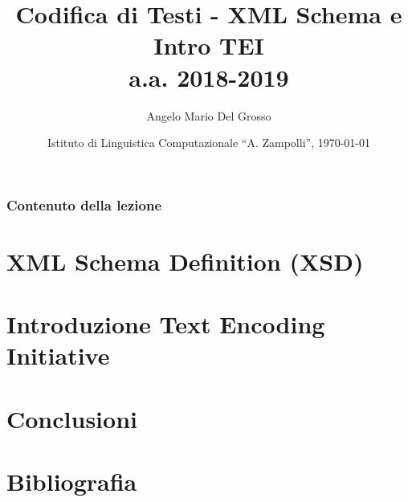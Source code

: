 \documentclass{beamer}
\title{Codifica di Testi - XML Schema e Intro TEI \\a.a. 2018-2019}
\author[A.M. Del Grosso]{Angelo Mario Del Grosso}
\institute{\texttt{angelo.delgrosso@ilc.cnr.it} \\\bigskip\textit{CNR-ILC-LicoLab}}
\date{Istituto di Linguistica Computazionale ``A. Zampolli'', \today}
\begin{document}
\begin{frame}
	\maketitle
\end{frame}

\begin{frame}
	\frametitle{Contenuto della lezione}
	\tableofcontents
\end{frame}

\section{XML Schema Definition (XSD)}


\section{Introduzione Text Encoding Initiative}


\section{Conclusioni}


\section*{Bibliografia}
%
\end{document}
